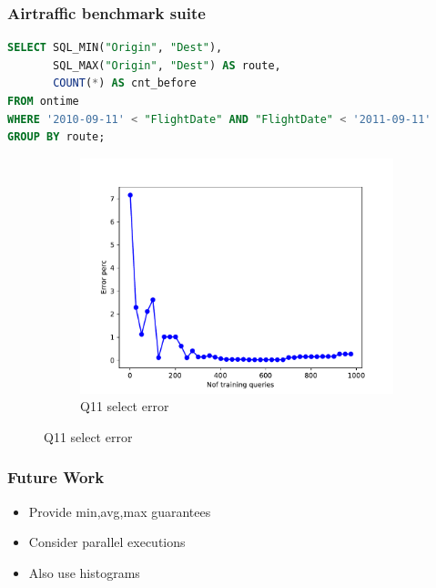 \begin{frame}[fragile]
\frametitle{Airtraffic benchmark suite}
\begin{lstlisting}[basicstyle=\ttfamily\footnotesize, language=SQL]
SELECT SQL_MIN("Origin", "Dest"),
       SQL_MAX("Origin", "Dest") AS route,
       COUNT(*) AS cnt_before
FROM ontime
WHERE '2010-09-11' < "FlightDate" AND "FlightDate" < '2011-09-11'
GROUP BY route;
\end{lstlisting}
	\begin{figure}[!htb]
	  \begin{subfigure}[t]{0.5\textwidth}
	    \includegraphics[scale=0.4]{../figs/airtraffic/airtraffic_sel11_error.pdf}
	    \caption{Q11 select error}
	    \label{fig:sel04}
	  \end{subfigure}
	\end{figure}
\end{frame}

\begin{frame}[fragile]
\frametitle{Future Work}
\begin{block}{}
\begin{itemize}
\item Provide min,avg,max guarantees
\item Consider parallel executions
\item Also use histograms
\end{itemize}
\end{block}
\end{frame}
